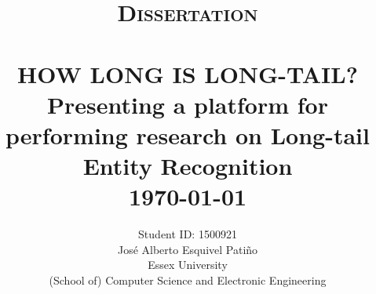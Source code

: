 \title{ \normalsize \textsc{Dissertation}
		\\ [2.0cm]
		\HRule{0.5pt} \\
		\LARGE \textbf{\uppercase{How long is long-tail?}} \\ 
		Presenting a platform for performing research on Long-tail Entity Recognition 
		\HRule{2pt} \\ [0.5cm]
        \normalsize \today \vspace*{5\baselineskip}}
\date{}

\author{
		Student ID: 1500921 \\ 
        José Alberto Esquivel Patiño \\
		Essex University \\
		(School of) Computer Science and Electronic Engineering }


\maketitle

\newpage

\tableofcontents

